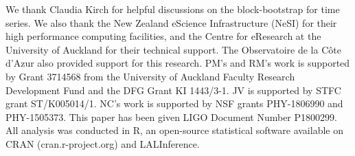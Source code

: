 \documentclass[aps,reprint,amsmath,amssymb,showpacs,showkeys]{revtex4-1}%
\newcommand{\cb}{ \color{blue}}
\begin{document}

\begin{acknowledgements}
  We thank Claudia Kirch for helpful discussions on the block-bootstrap for time series.  We also thank the New Zealand eScience Infrastructure (NeSI) for their high performance computing facilities, and the Centre for eResearch at the University of Auckland for their technical support. The Observatoire de la C\^{o}te d'Azur also provided support for this research. PM's and RM's work is supported by Grant 3714568 from the University of Auckland Faculty Research Development Fund and the DFG Grant KI 1443/3-1. JV is supported by STFC grant ST/K005014/1. NC's work is supported by NSF grants PHY-1806990 and PHY-1505373. This paper has been given LIGO Document Number P1800299.  All analysis was conducted in \textsf{R}, an open-source statistical software available on \textsf{CRAN} (cran.r-project.org) and LALInference.
\end{acknowledgements}
\pagebreak






\end{document}

